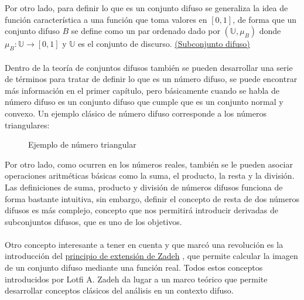 Por otro lado, para definir lo que es un conjunto difuso se generaliza la idea de función característica a una función que toma valores en $[0, 1]$, de forma que un conjunto difuso $B$ se define como un par ordenado dado por $(\mathbb{U}, \mu_B)$ donde $\mu_B : \mathbb{U} \longrightarrow [0,1]$ y $\mathbb{U}$ es el conjunto de discurso. \hyperref[def:subconjunto_difuso]{(Subconjunto difuso)} \\ \\
Dentro de la teoría de conjuntos difusos también se pueden desarrollar una serie de términos para tratar de definir lo que es un número difuso, se puede encontrar más información en el primer capítulo, pero básicamente cuando se habla de número difuso es un conjunto difuso que cumple que es un conjunto normal y convexo. Un ejemplo clásico de número difuso corresponde a los números triangulares:
\begin{figure}[H]
	\centering
	\caption{Ejemplo de número triangular}
\end{figure}
Por otro lado, como ocurren en los números reales, también se le pueden asociar operaciones aritméticas básicas como la suma, el producto, la resta y la división. Las definiciones de suma, producto y división de números difusos funciona de forma bastante intuitiva, sin embargo, definir el concepto de resta de dos números difusos es más complejo, concepto que nos permitirá introducir derivadas de subconjuntos difusos, que es uno de los objetivos.
\\ \\
Otro concepto interesante a tener en cuenta y que marcó una revolución es la introducción del \hyperref[def:zadeh]{principio de extensión de Zadeh} \cite{fuzzyintro}, que permite calcular la imagen de un conjunto difuso mediante una función real. Todos estos conceptos introducidos por Lotfi A. Zadeh da lugar a un marco teórico que permite desarrollar conceptos clásicos del análisis en un contexto difuso.

